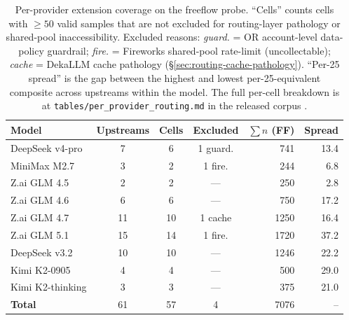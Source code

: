 \documentclass[11pt,a4paper]{article}
\begin{document}
\begin{table}[h]
\centering
\caption{Per-provider extension coverage on the freeflow probe. ``Cells'' counts cells with $\geq 50$ valid samples that are not excluded for routing-layer pathology or shared-pool inaccessibility. Excluded reasons: \emph{guard.} = OR account-level data-policy guardrail; \emph{fire.} = Fireworks shared-pool rate-limit (uncollectable); \emph{cache} = DekaLLM cache pathology (\S\ref{sec:routing-cache-pathology}). ``Per-25 spread'' is the gap between the highest and lowest per-25-equivalent composite across upstreams within the model. The full per-cell breakdown is at \texttt{tables/per\_provider\_routing.md} in the released corpus \citep{tenner2026corpus}.}
\label{tab:per-provider-coverage}
\small
\begin{tabular}{lcccrr}
\toprule
\textbf{Model} & \textbf{Upstreams} & \textbf{Cells} & \textbf{Excluded} & \textbf{$\sum n$ (FF)} & \textbf{Spread} \\
\midrule
DeepSeek v4-pro     & 7  & 6  & 1 guard.   &  741 & 13.4 \\
MiniMax M2.7        & 3  & 2  & 1 fire.    &  244 &  6.8 \\
Z.ai GLM 4.5        & 2  & 2  & ---        &  250 &  2.8 \\
Z.ai GLM 4.6        & 6  & 6  & ---        &  750 & 17.2 \\
Z.ai GLM 4.7        & 11 & 10 & 1 cache    & 1250 & 16.4 \\
Z.ai GLM 5.1        & 15 & 14 & 1 fire.    & 1720 & 37.2 \\
DeepSeek v3.2       & 10 & 10 & ---        & 1246 & 22.2 \\
Kimi K2-0905        & 4  & 4  & ---        &  500 & 29.0 \\
Kimi K2-thinking    & 3  & 3  & ---        &  375 & 21.0 \\
\midrule
\textbf{Total}      & 61 & 57 & 4          & 7076 & --   \\
\bottomrule
\end{tabular}
\end{table}
\end{document}
